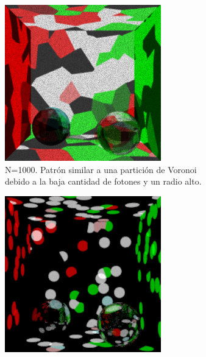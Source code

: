 \documentclass{article}
\begin{document}
\begin{figure}
\begin{subfigure}[h]{0.22\linewidth}
\includegraphics[width=\linewidth]{imgs/1k10kv.png}
\caption{N=1000. Patrón similar a una partición de Voronoi debido a la baja cantidad de fotones y un radio alto.}
\end{subfigure}
\hfill
\begin{subfigure}[h]{0.22\linewidth}
\includegraphics[width=\linewidth]{imgs/1k10k.png}

\end{subfigure}
\end{figure}
\end{document}
